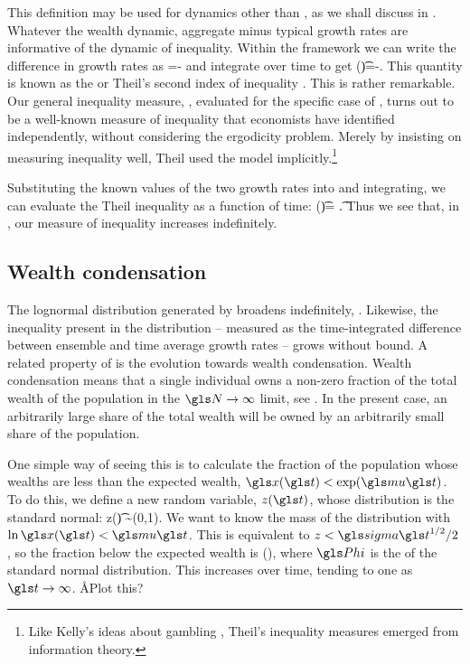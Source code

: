 This definition may be used for dynamics other than \GBM, as we shall discuss in . Whatever the wealth dynamic, aggregate minus typical growth rates are informative of the dynamic of inequality. Within the \GBM framework we can write the difference in growth rates as 
\be
\frac{\gd \J}{\gd\t}=\frac{\gd \ln \ave{\x}}{\gd\t}-\frac{\gd \ave{\ln \x}}{\gd\t}
\ee
and integrate over time to get
\be
\J(\t)=\ln \ave{\x(\t)}-\ave{\ln \x(\t)}.
\ee
This quantity is known as the \MLD or Theil's second index of inequality \cite{Theil1967}. This is rather remarkable. Our general inequality measure, , evaluated for the specific case of \GBM, turns out to be a well-known measure of inequality that economists have identified independently, without considering the ergodicity problem. Merely by insisting on measuring inequality well, Theil used the \GBM model implicitly.\footnote{Like Kelly's ideas about gambling \cite{Kelly1956}, Theil's inequality measures emerged from information theory.}

Substituting the known values of the two growth rates into  and integrating, we can evaluate the Theil inequality as a function of time:
\be
\J(\t)= \t.
\ee
Thus we see that, in \GBM, our measure of inequality increases indefinitely.


\subsection{Wealth condensation}
The lognormal distribution generated by \GBM broadens indefinitely, . Likewise, the inequality present in the distribution -- measured as the time-integrated difference between ensemble and time average growth rates -- grows without bound. A related property of \GBM is the evolution towards wealth condensation. Wealth condensation means that a single individual owns a non-zero fraction of the total wealth of the population in the $\N\to\infty$ limit, see \eg \cite{BouchaudMezard2000}. In the present case, an arbitrarily large share of the  total wealth will be owned by an arbitrarily small share of the population.

One simple way of seeing this is to calculate the fraction of the population whose wealths are less than the expected wealth, \ie $\x(\t)<\exp(\gmu \t)$. To do this, we define a new random variable, $z(\t)$, whose distribution is the standard normal:
\be
z(\t) \equiv {} \sim \mathcal{\N}(0,1).
\ee
We want to know the mass of the distribution with $\ln \x(\t)<\gmu \t$. This is equivalent to $z<\gsigma \t^{1/2}/2$, so the fraction below the expected wealth is
\be
\gPhi\left(\right),
\ee
where $\gPhi$ is the \CDF of the standard normal distribution. This increases over time, tending to one as $\t\to\infty$. \AA{Plot this?}

